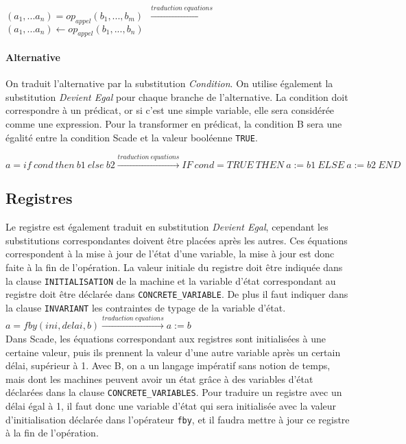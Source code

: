 \texttt{$(a_1, ... a_n) = op_{appel}(b_1, ..., b_m)$
$\xrightarrow{traduction ~ equations}$ $(a_1, ... a_n) \leftarrow
op_{appel}(b_1,..., b_n)$} 

\paragraph{Alternative}
On traduit l'alternative par la substitution \emph{Condition}. On utilise
également la substitution \emph{Devient Egal} pour chaque branche de
l'alternative.
La condition doit correspondre à un prédicat, or si c'est une simple variable,
elle sera considérée comme une expression. Pour la transformer en prédicat, la
condition B sera une égalité entre la condition Scade et la valeur
booléenne \texttt{TRUE}.

\noindent
\begin{small}
\texttt{$ a=if~cond~then~b1~else~b2\xrightarrow{traduction~equations}IF~cond=TRUE~THEN~a:=b1~ELSE~a:=b2~END$}
\end{small}

\subsection*{Registres}

Le registre est également traduit en substitution \emph{Devient Egal}, cependant
les substitutions correspondantes doivent être placées après les autres. Ces
équations correspondent à la mise à jour de l'état d'une variable, la mise à
jour est donc faite à la fin de l'opération. La valeur initiale du registre doit
être indiquée dans la clause \texttt{INITIALISATION} de la machine et la variable d'état
correspondant au registre doit être déclarée dans \texttt{CONCRETE\_VARIABLE}. De
plus il faut indiquer dans la clause \texttt{INVARIANT} les contraintes de typage
de la variable d'état. \\

\texttt{$a = fby(ini, delai, b) \xrightarrow{traduction ~ equations} a := b$ }\\

Dans Scade, les équations correspondant aux registres sont initialisées à une
certaine valeur, puis ils prennent la valeur d'une autre variable après un
certain délai, supérieur à 1.
Avec B, on a un langage impératif sans notion de temps, mais dont les machines
peuvent avoir un état grâce à des variables d'état déclarées dans la
clause \texttt{CONCRETE\_VARIABLES}. Pour traduire un registre avec un délai égal
à 1, il faut donc une variable d'état qui sera initialisée avec la valeur
d'initialisation déclarée dans l'opérateur \texttt{fby}, et il faudra mettre à
jour ce registre à la fin de l'opération.

